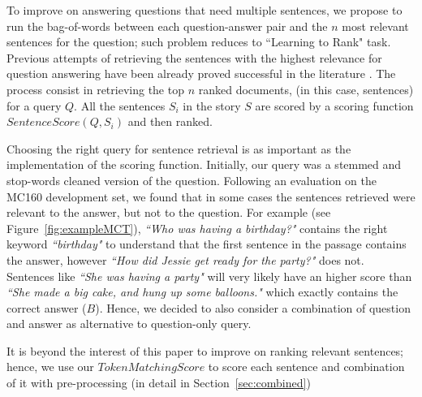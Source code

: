 
To improve on answering questions that need multiple sentences, we propose to run the bag-of-words between each question-answer pair and the $n$ most relevant sentences for the question; such problem reduces to ``Learning to Rank" task. Previous attempts of retrieving the sentences with the highest relevance for question answering have been already proved successful in the literature \cite{qa_techniques,deep_selection}. %
The process consist in retrieving the top $n$ ranked documents, (in this case, sentences) for a query $Q$. All the sentences $S_i$ in the story $S$ are scored by a scoring function $SentenceScore(Q, S_i)$ and then ranked.

Choosing the right query for sentence retrieval is as important as the implementation of the scoring function. Initially, our query was a stemmed and stop-words cleaned version of the question. Following an evaluation on the MC160 development set, we found that in some cases the sentences retrieved were relevant to the answer, but not to the question. For example (see Figure~\ref{fig:exampleMCT}), {\em ``Who was having a birthday?"} contains the right keyword {\em ``birthday"} to understand that the first sentence in the passage contains the answer, however {\em ``How did Jessie get ready for the party?"} does not. Sentences like {\em ``She was having a party"} will very likely have an higher score than {\em ``She made a big cake, and hung up some balloons."} which exactly contains the correct answer ($B$). Hence, we decided to also consider a combination of question and answer as alternative to question-only query.

It is beyond the interest of this paper to improve on ranking relevant sentences; hence, we use our $TokenMatchingScore$ to score each sentence and combination of it with pre-processing (in detail in Section~\ref{sec:combined})